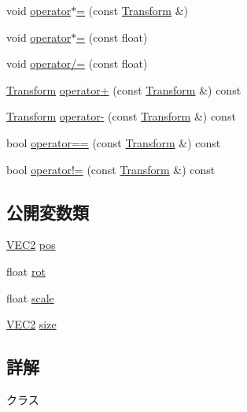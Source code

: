 \begin{DoxyCompactItemize}
\item 
void \mbox{\hyperlink{class_transform_a3746d6759ca289e8cd4982e889e7ec6b}{operator$\ast$=}} (const \mbox{\hyperlink{class_transform}{Transform}} \&)
\item 
void \mbox{\hyperlink{class_transform_ab13378f63abf5bc132841f83423a634d}{operator$\ast$=}} (const float)
\item 
void \mbox{\hyperlink{class_transform_aa38455bbe5aed5f9dfd98a8d3b8a24ec}{operator/=}} (const float)
\item 
\mbox{\hyperlink{class_transform}{Transform}} \mbox{\hyperlink{class_transform_a8e21c258146adde8ca798878bab9ce9d}{operator+}} (const \mbox{\hyperlink{class_transform}{Transform}} \&) const
\item 
\mbox{\hyperlink{class_transform}{Transform}} \mbox{\hyperlink{class_transform_a17493155309aa1650de99ce384f096a6}{operator-\/}} (const \mbox{\hyperlink{class_transform}{Transform}} \&) const
\item 
bool \mbox{\hyperlink{class_transform_a0a2d49f8c1b9a2229846534f9bcc63d4}{operator==}} (const \mbox{\hyperlink{class_transform}{Transform}} \&) const
\item 
bool \mbox{\hyperlink{class_transform_ae0aed78dcd6aaeb786ec0bdadafa9498}{operator!=}} (const \mbox{\hyperlink{class_transform}{Transform}} \&) const
\end{DoxyCompactItemize}
\subsection*{公開変数類}
\begin{DoxyCompactItemize}
\item 
\mbox{\hyperlink{transform_8h_afb0c5e21d4133ff4f200992c0b534e1b}{V\+E\+C2}} \mbox{\hyperlink{class_transform_a25bce2389cc280e8adf193bdbb00d94a}{pos}}
\item 
float \mbox{\hyperlink{class_transform_a2b471ae0000c6959dc9b07263933aa43}{rot}}
\item 
float \mbox{\hyperlink{class_transform_a631712eb230305f58d164086d492701b}{scale}}
\item 
\mbox{\hyperlink{transform_8h_afb0c5e21d4133ff4f200992c0b534e1b}{V\+E\+C2}} \mbox{\hyperlink{class_transform_a83e0bdbf8a2b4a45197d17d7415a6874}{size}}
\end{DoxyCompactItemize}


\subsection{詳解}
クラス 

